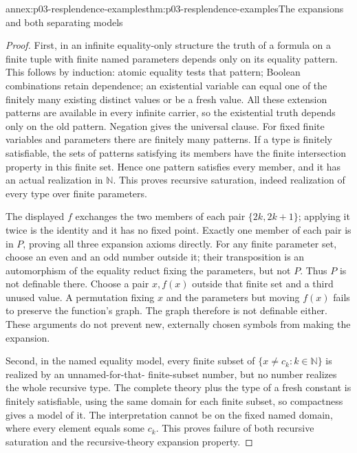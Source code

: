 \begin{annexitem}{annex:p03-resplendence-examples}{thm:p03-resplendence-examples}{The expansions and both separating models}
\begin{proof}
First, in an infinite equality-only structure the truth of a formula on
a finite tuple with finite named parameters depends only on its equality
pattern. This follows by induction: atomic equality tests that pattern;
Boolean combinations retain dependence; an existential variable can equal
one of the finitely many existing distinct values or be a fresh value.
All these extension patterns are available in every infinite carrier,
so the existential truth depends only on the old pattern. Negation gives
the universal clause. For fixed finite variables and parameters there
are finitely many patterns. If a type is finitely satisfiable, the sets
of patterns satisfying its members have the finite intersection property
in this finite set. Hence one pattern satisfies every member, and it has
an actual realization in \(\mathbb N\). This proves recursive saturation,
indeed realization of every type over finite parameters.

The displayed \(f\) exchanges the two members of each pair
\(\{2k,2k+1\}\); applying it twice is the identity and it has no
fixed point. Exactly one member of each pair is in \(P\), proving all
three expansion axioms directly. For any finite parameter set, choose
an even and an odd number outside it; their transposition is an automorphism
of the equality reduct fixing the parameters, but not \(P\). Thus
\(P\) is not definable there. Choose a pair \(x,f(x)\) outside that
finite set and a third unused value. A permutation fixing \(x\) and
the parameters but moving \(f(x)\) fails to preserve the function's
graph. The graph therefore is not definable either. These arguments do
not prevent new, externally chosen symbols from making the expansion.

Second, in the named equality model, every finite subset of
\(\{x\ne c_k:k\in\mathbb N\}\) is realized by an unnamed-for-that-
finite-subset number, but no number realizes the whole recursive type.
The complete theory plus the type of a fresh constant is finitely
satisfiable, using the same domain for each finite subset, so compactness
gives a model of it. The interpretation cannot be on the fixed named
domain, where every element equals some \(c_k\). This proves failure
of both recursive saturation and the recursive-theory expansion property.


\end{proof}
\end{annexitem}
